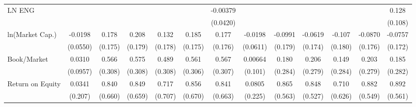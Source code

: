 {\begin{tabular}{l*{12}{c}}
LN ENG              &                     &                     &                     &                     &                     &    -0.00379         &                     &                     &                     &                     &                     &       0.128         \\
                    &                     &                     &                     &                     &                     &    (0.0420)         &                     &                     &                     &                     &                     &     (0.108)         \\
ln(Market Cap.)     &     -0.0198         &       0.178         &       0.208         &       0.132         &       0.185         &       0.177         &     -0.0198         &     -0.0991         &     -0.0619         &      -0.107         &     -0.0870         &     -0.0757         \\
                    &    (0.0550)         &     (0.175)         &     (0.179)         &     (0.178)         &     (0.175)         &     (0.176)         &    (0.0611)         &     (0.179)         &     (0.174)         &     (0.180)         &     (0.176)         &     (0.172)         \\
Book/Market         &      0.0310         &       0.566\sym{*}  &       0.575\sym{*}  &       0.489         &       0.561\sym{*}  &       0.567\sym{*}  &     0.00664         &       0.180         &       0.206         &       0.149         &       0.203         &       0.185         \\
                    &    (0.0957)         &     (0.308)         &     (0.308)         &     (0.308)         &     (0.306)         &     (0.307)         &     (0.101)         &     (0.284)         &     (0.279)         &     (0.284)         &     (0.279)         &     (0.282)         \\
Return on Equity    &      0.0341         &       0.840         &       0.849         &       0.717         &       0.856         &       0.841         &      0.0805         &       0.865         &       0.848         &       0.710         &       0.882         &       0.892         \\
                    &     (0.207)         &     (0.660)         &     (0.659)         &     (0.707)         &     (0.670)         &     (0.663)         &     (0.225)         &     (0.563)         &     (0.527)         &     (0.626)         &     (0.549)         &     (0.561)         \\

\end{tabular}}

